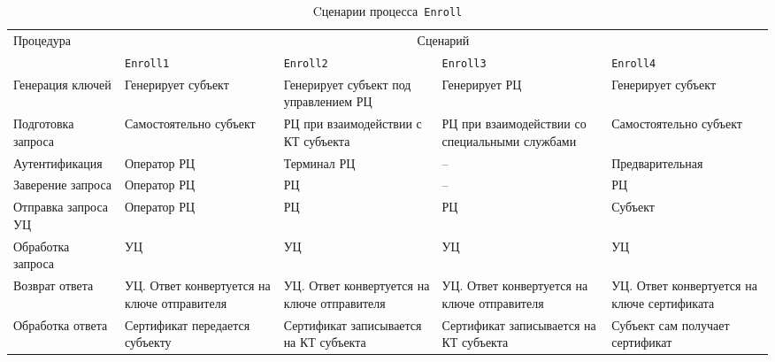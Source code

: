 \begin{table}[bht]
\caption{Cценарии процесса~\texttt{Enroll}} 
\label{Table.ENROLL.Summary}
\begin{tabular}{|p{3cm}|p{3cm}|p{3cm}|p{3cm}|p{3cm}|}
\hline
Процедура & \multicolumn{4}{|c|}{Сценарий}\\
\cline{2-5}
&\texttt{Enroll1}&\texttt{Enroll2}&\texttt{Enroll3}&\texttt{Enroll4}\\
\hline
\hline
Генерация ключей & 
Генерирует субъект & 
Генерирует субъект под управлением РЦ &
Генерирует РЦ &
Генерирует субъект\\
\hline
%
Подготовка запроса & 
Самостоятельно субъект & 
РЦ при взаимодействии с КТ субъекта &
РЦ при взаимодействии со специальными службами &
Самостоятельно субъект\\
\hline
%
Аутентификация & 
Оператор РЦ &
Терминал РЦ & 
-- & 
Предварительная\\
\hline
%
Заверение запроса & 
Оператор РЦ &
РЦ & 
-- & 
РЦ\\
\hline
%
Отправка запроса УЦ & 
Оператор РЦ &
РЦ & 
РЦ & 
Субъект\\
\hline
%
Обработка запроса & 
УЦ &
УЦ & 
УЦ & 
УЦ\\
\hline
%
Возврат ответа & 
УЦ. Ответ конвертуется на ключе отправителя &
УЦ. Ответ конвертуется на ключе отправителя &
УЦ. Ответ конвертуется на ключе отправителя &
УЦ. Ответ конвертуется на ключе сертификата\\
\hline
%
Обработка ответа & 
Сертификат передается субъекту &
Сертификат записывается на КТ субъекта &
Сертификат записывается на КТ субъекта &
Субъект сам получает сертификат\\
\hline
\end{tabular}
\end{table}
